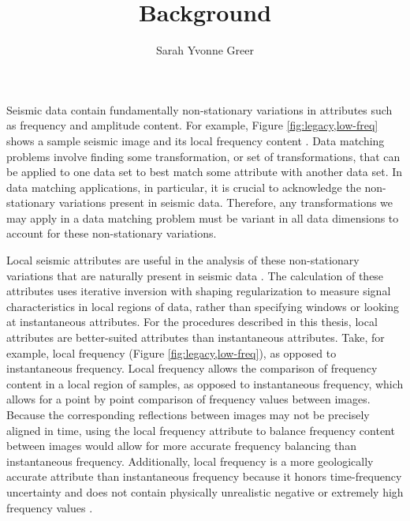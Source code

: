 \title{Background}
\author{Sarah Yvonne Greer}
\maketitle
{}
Seismic data contain fundamentally non-stationary variations in attributes such as frequency and amplitude content.
For example, Figure \ref{fig:legacy,low-freq} shows a sample seismic image and its local frequency content \cite[]{locfreq}.
Data matching problems involve finding some transformation, or set of transformations, that can be applied to one data set to best match some attribute with another data set.
In data matching applications, in particular, it is crucial to acknowledge the non-stationary variations present in seismic data.
Therefore, any transformations we may apply in a data matching problem must be variant in all data dimensions to account for these non-stationary variations.

Local seismic attributes are useful in the analysis of these non-stationary variations that are naturally present in seismic data \cite{attr}.
The calculation of these attributes uses iterative inversion with shaping regularization \cite{shap} to measure signal characteristics in local regions of data, rather than specifying windows or looking at instantaneous attributes.
For the procedures described in this thesis, local attributes are better-suited attributes than instantaneous attributes.
Take, for example, local frequency (Figure \ref{fig:legacy,low-freq}), as opposed to instantaneous frequency.
Local frequency allows the comparison of frequency content in a local region of samples, as opposed to instantaneous frequency, which allows for a point by point comparison of frequency values between images. 
Because the corresponding reflections between images may not be precisely aligned in time, using the local frequency attribute to balance frequency content between images would allow for more accurate frequency balancing than instantaneous frequency. 
Additionally, local frequency is a more geologically accurate attribute than instantaneous frequency because it honors time-frequency uncertainty and does not contain physically unrealistic negative or extremely high frequency values \cite[]{attr}.


